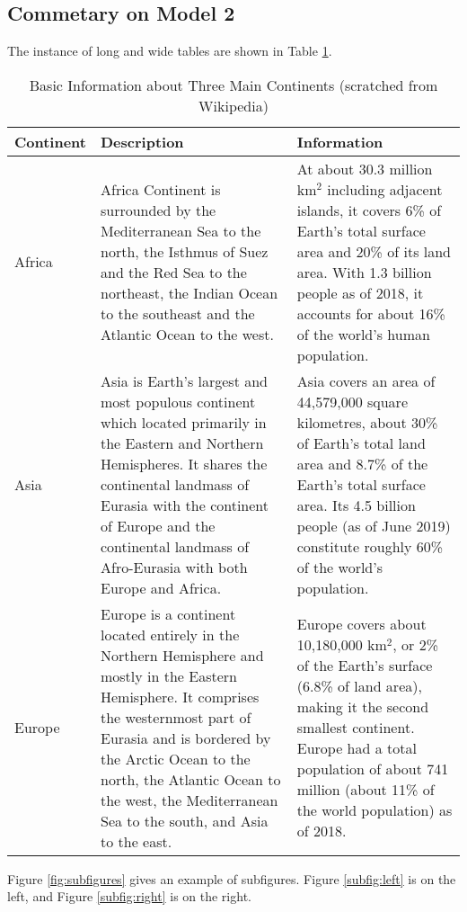 \documentclass[12pt]{article}  %
\begin{document}
\subsection{Commetary on Model 2}
The instance of long and wide tables are shown in Table \ref{tb:longtable}.

\begin{longtable}{ p{4em} p{14em} p{14em} }
\caption{Basic Information about Three Main Continents (scratched from Wikipedia)}
\label{tb:longtable}\\
\toprule
Continent & Description & Information \\
\midrule
Africa & Africa Continent is surrounded by the Mediterranean Sea to the
north, the Isthmus of Suez and the Red Sea to the northeast, the Indian
Ocean to the southeast and the Atlantic Ocean to the west. &
At about 30.3 million km$^2$ including adjacent islands, it covers 6\%
of Earth's total surface area and 20\% of its land area. With 1.3
billion people as of 2018, it accounts for about 16\% of the world's
human population. \\
\midrule
Asia & Asia is Earth's largest and most populous continent which
located primarily in the Eastern and Northern Hemispheres.
It shares the continental landmass of Eurasia with the continent
of Europe and the continental landmass of Afro-Eurasia with both
Europe and Africa. &
Asia covers an area of 44,579,000 square kilometres, about 30\%
of Earth's total land area and 8.7\% of the Earth's total surface
area. Its 4.5 billion people (as of June 2019) constitute roughly
60\% of the world's population. \\
\midrule
Europe & Europe is a continent located entirely in the Northern
Hemisphere and mostly in the Eastern Hemisphere. It comprises the
westernmost part of Eurasia and is bordered by the Arctic Ocean to
the north, the Atlantic Ocean to the west, the Mediterranean Sea to
the south, and Asia to the east. &
Europe covers about 10,180,000 km$^2$, or 2\% of the Earth's surface
(6.8\% of land area), making it the second smallest
continent. Europe had a total population of about 741 million (about
11\% of the world population) as of 2018. \\
\bottomrule
\end{longtable}

Figure \ref{fig:subfigures} gives an example of subfigures. Figure \ref{subfig:left} is on the left, and Figure \ref{subfig:right} is on the right.
\end{document}
